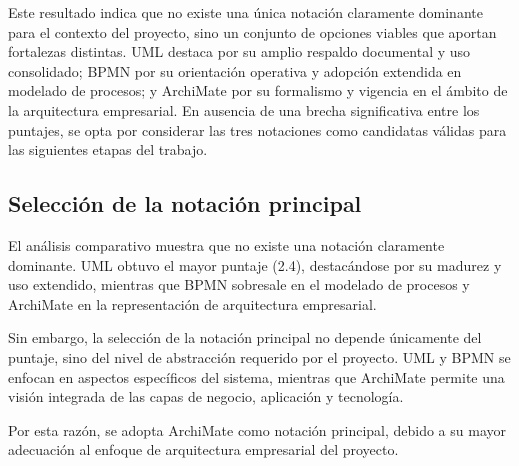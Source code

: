 Este resultado indica que no existe una única notación claramente dominante para el contexto del proyecto, sino un conjunto de opciones viables que aportan fortalezas distintas. UML destaca por su amplio respaldo documental y uso consolidado; BPMN por su orientación operativa y adopción extendida en modelado de procesos; y ArchiMate por su formalismo y vigencia en el ámbito de la arquitectura empresarial. En ausencia de una brecha significativa entre los puntajes, se opta por considerar las tres notaciones como candidatas válidas para las siguientes etapas del trabajo.

\subsection{Selección de la notación principal}
El análisis comparativo muestra que no existe una notación claramente dominante. UML obtuvo el mayor puntaje (2.4), destacándose por su madurez y uso extendido, mientras que BPMN sobresale en el modelado de procesos y ArchiMate en la representación de arquitectura empresarial.

Sin embargo, la selección de la notación principal no depende únicamente del puntaje, sino del nivel de abstracción requerido por el proyecto. UML y BPMN se enfocan en aspectos específicos del sistema, mientras que ArchiMate permite una visión integrada de las capas de negocio, aplicación y tecnología.

Por esta razón, se adopta ArchiMate como notación principal, debido a su mayor adecuación al enfoque de arquitectura empresarial del proyecto.